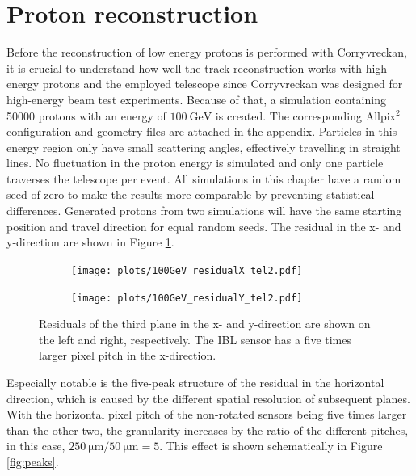 \section{Proton reconstruction}\label{sec:proton_reconstruction}
Before the reconstruction of low energy protons is performed with Corryvreckan, it is crucial to understand how well the
track reconstruction works with high-energy protons and the employed telescope since Corryvreckan was designed for high-energy beam test experiments.
Because of that, a simulation containing 50000 protons
with an energy of $\SI{100}{\giga\eV}$ is created. The corresponding Allpix$^2$ configuration and geometry files are attached in the appendix.
Particles in this energy region only have small scattering angles, effectively travelling
in straight lines.
No fluctuation in the proton energy is simulated and only one particle traverses
the telescope per event. All simulations in this chapter have a random seed of zero to make the results more comparable by preventing
statistical differences. Generated protons from two simulations will have the same starting position and travel direction for equal random seeds.
The residual in the x- and y-direction are shown in Figure \ref{fig:100GeV}.

\begin{figure}
  \hspace{-0.6cm}
  \begin{subfigure}{0.51\textwidth}
      \centering
      \texttt{[image: plots/100GeV\_residualX\_tel2.pdf]}
  \end{subfigure}
  \begin{subfigure}{0.51\textwidth}
      \texttt{[image: plots/100GeV\_residualY\_tel2.pdf]}
  \end{subfigure}
  \caption{Residuals of the third plane in the x- and y-direction are shown on the left and right, respectively.
  The IBL sensor has a five times larger pixel pitch in the x-direction. }
  \label{fig:100GeV}
\end{figure}

Especially notable is the five-peak structure of the residual in the horizontal direction, which is caused by the different
spatial resolution of subsequent planes. With the horizontal pixel pitch of the non-rotated sensors being
five times larger than the other two, the granularity increases by the ratio of the different pitches, in this case,
\mbox{$\SI{250}{\micro\meter}/\SI{50}{\micro\meter} = 5$}. This effect is shown schematically in Figure \ref{fig:peaks}.


